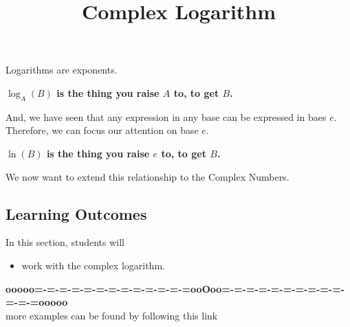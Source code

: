 \documentclass{ximera}
\title{Complex Logarithm}
\begin{document}
\begin{abstract}
%
\end{abstract}
\maketitle






Logarithms are exponents.

\begin{center}
\textbf{\textcolor{red!80!black}{$\log_A(B)$ is the thing you raise $A$ to, to get $B$.}}
\end{center}


And, we have seen that any expression in any base can be expressed in baes $e$. Therefore, we can focus our attention on base $e$.



\begin{center}
\textbf{\textcolor{red!80!black}{$\ln(B)$ is the thing you raise $e$ to, to get $B$.}}
\end{center}





We now want to extend this relationship to the Complex Numbers.







\subsection{Learning Outcomes}

\begin{sectionOutcomes}
In this section, students will 

\begin{itemize}
\item work with the complex logarithm.
\end{itemize}
\end{sectionOutcomes}
















\begin{center}
\textbf{\textcolor{green!50!black}{ooooo=-=-=-=-=-=-=-=-=-=-=-=-=ooOoo=-=-=-=-=-=-=-=-=-=-=-=-=ooooo}} \\

more examples can be found by following this link\\ 

\end{center}
\end{document}
